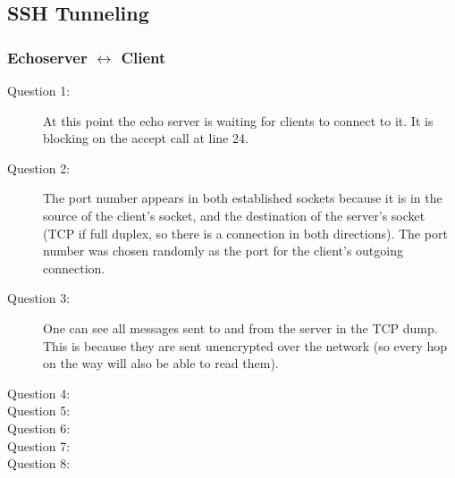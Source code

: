 \subsection{SSH Tunneling}
\subsubsection{{\sc Echoserver} $\leftrightarrow$ {\sc Client}}
\begin{description}
    \item[Question 1:] At this point the echo server is waiting for clients to connect to it. It is blocking on
        the accept call at line 24.
    \item[Question 2:] The port number appears in both established sockets because it is in the source of the client's
        socket, and the destination of the server's socket (TCP if full duplex, so there is a connection in both directions).
        The port number was chosen randomly as the port for the client's outgoing connection.
    \item[Question 3:] One can see all messages sent to and from the server in the TCP dump. This is because they are sent
        unencrypted over the network (so every hop on the way will also be able to read them).
    \item[Question 4:] 
    \item[Question 5:] 
    \item[Question 6:] 
    \item[Question 7:] 
    \item[Question 8:] 
\end{description}
